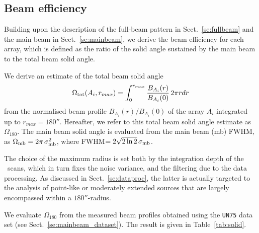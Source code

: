 \subsection{Beam efficiency}
\label{se:beam_efficiency}

Building upon the description of the full-beam pattern in
Sect.~\ref{se:fullbeam} and the main beam in Sect.~\ref{se:mainbeam},
we derive the beam efficiency for each array, which is defined as the
ratio of the solid angle sustained by the main beam to the total beam
solid angle.

We derive an estimate of the total beam solid angle
\begin{equation}
  \Omega_{\rm{tot}} (A_i, r_{max}) = \int_0^{r_{max}} \frac{B_{A_i}(r)}{B_{A_i}(0)} \,  2 \pi r dr
  \label{eq:omega_tot}
\end{equation}
from the normalised beam profile $B_{A_i}(r)/B_{A_i}(0)$ of the array
$A_i$ integrated up to $r_{max} = 180''$. {\lp Hereafter, we refer to
this total beam solid angle estimate as $\Omega_{180}$.}
The main beam solid angle is
evaluated from the main beam (mb) FWHM, as
$\Omega_{\rm{mb}} = 2 \pi\,  \sigma_{\rm{mb}}^2$, where FWHM$ =
2\sqrt{2\ln{2}}\, \sigma_{\rm{mb}}$. 

The choice of the maximum radius is set both by the integration depth of
the \bm\ scans, which in turn fixes the noise variance, and the
filtering due to the data processing. {\lp As discussed in
Sect.~\ref{se:dataproc}, the latter is actually targeted to the analysis of
point-like or moderately extended sources that are largely encompassed
within a $180''$-radius.}

We evaluate {\lp $\Omega_{180}$} from the measured beam profiles
obtained using the {\tt UN75} data set (see Sect.~\ref{se:mainbeam_dataset}).
The result is given in Table~\ref{tab:solid}.


